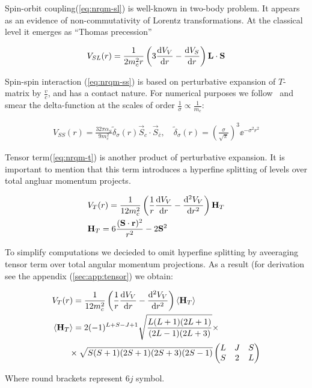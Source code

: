 Spin-orbit coupling(\cref{eq:nrqm-sl}) is well-known in two-body problem. It appears as an evidence of non-commutativity of Lorentz transformations. At the classical level it emerges as ``Thomas precession''~\cite{thomas}

\begin{align} \label{eq:nrqm-sl}
    V_{SL}(r) = \frac{1}{2 m_c^2 r} \left( 3 \dv{V_V}{r} - \dv{V_S}{r} \right) \mathbf{L} \cdot \mathbf{S}
\end{align}

Spin-spin interaction (\cref{eq:nrqm-ss}) is based on perturbative expansion of $T$-matrix by $\frac{v}{c}$, and has a contact nature. For numerical purposes we follow~\cite{gbs-model} and smear the delta-function at the scales of order $\frac{1}{\sigma} \propto \frac{1}{m_c}$:

\begin{align} \label{eq:nrqm-ss}
    V_{SS}(r) = \frac{32 \pi \alpha_S}{9 m_c^2} \tilde{\delta}_\sigma(r) \vec{S}_c \cdot \vec{S}_{\bar{c}},\quad \tilde{\delta}_\sigma(r) = \left(\frac{\sigma}{\sqrt{\pi}}\right)^3 \ee^{-\sigma^2 r^2}
\end{align}

Tensor term(\cref{eq:nrqm-t}) is another product of perturbative expansion. It is important to mention that this term introduces a hyperfine splitting of levels over total angluar momentum projects.

\begin{align} \label{eq:nrqm-t}
    &V_T(r) = \frac{1}{12 m_c^2} \left( \frac{1}{r} \dv{V_V}{r} - \dv[2]{V_V}{r} \right) \mathbf{H}_T \\
    &\mathbf{H}_T = 6\frac{(\mathbf{S} \cdot \mathbf{r})^2}{r^2} - 2\mathbf{S}^2
\end{align}

To simplify computations we decieded to omit hyperfine splitting by aveeraging tensor term over total angular momentum projections. As a result (for derivation see the appendix (\cref{sec:app:tensor}) we obtain:

\begin{align}
    &V_T(r) = \frac{1}{12 m_c^2} \left( \frac{1}{r} \dv{V_V}{r} - \dv[2]{V_V}{r} \right) \left<\mathbf{H}_T\right> \\
    &\left<\mathbf{H}_T\right> = 2 (-1)^{L+S-J+1} \sqrt{\frac{L(L+1)(2L+1)}{(2L-1)(2L+3)}} \times \nonumber \\
    &\qquad \times \sqrt{S(S+1)(2S+1)(2S+3)(2S-1)} \left( \begin{matrix}
                                                L & J & S \\
                                                S & 2 & L
                                              \end{matrix} \right)
\end{align}

Where round brackets represent $6j$ symbol.

